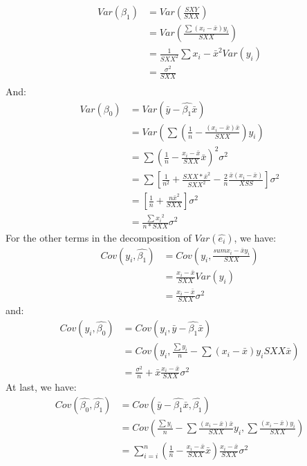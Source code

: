 \documentclass[12pt]{article}
\begin{document}
{\begin{align*}
 Var(\beta_1)&=Var(\frac{SXY}{SXX})\\
             &=Var(\frac{\sum{(x_i-\bar{x})}y_i}{SXX})\\
             &=\frac{1}{SXX^2}\sum{x_i-\bar{x}}^2Var(y_i)\\
             &=\frac{\sigma^2}{SXX}\\
\end{align*}
And:\\
\begin{align*}
 Var(\beta_0)&=Var(\bar{y}-\hat{\beta_1}\bar{x})\\
             &=Var(\sum{(\frac{1}{n}-\frac{(x_i-\bar{x})\bar{x}}{SXX})y_i})\\
             &=\sum{(\frac{1}{n}-\frac{x_i-\bar{x}}{SXX}\bar{x})^2}\sigma^2\\
             &=\sum{[\frac{1}{n^2}+\frac{SXX*\bar{x}^2}{SXX^2}-\frac{2}{n}\frac{\bar{x}(x_i-\bar{x})}{XSS}]}\sigma^2\\
             &=[\frac{1}{n}+\frac{n\bar{x}^2}{SXX}]\sigma^2\\
             &=\frac{\sum{x_i}^2}{n*SXX}\sigma^2
\end{align*}
For the other terms in the decomposition of $Var(\hat{e_i})$, we
have:\\
\begin{align*}
 Cov(y_i,\hat{\beta_1})&=Cov(y_i,\frac{sum{x_i-\bar{x}}y_i}{SXX})\\
                       &=\frac{x_i-\bar{x}}{SXX}Var(y_i)\\
                       &=\frac{x_i-\bar{x}}{SXX}\sigma^2
\end{align*}
and:\\
\begin{align*}
 Cov(y_i,\hat{\beta_0})&=Cov(y_i,\bar{y}-\hat{\beta_1}\bar{x})\\
                       &=Cov(y_i,\frac{\sum{y_i}}{n}-\sum{(x_i-\bar{x})y_i}{SXX}\bar{x})\\
                       &=\frac{\sigma^2}{n}+\bar{x}\frac{x_i-\bar{x}}{SXX}\sigma^2
\end{align*}
At last, we have:\\
\begin{align*}
 Cov(\hat{\beta_0},\hat{\beta_1})&=Cov(\bar{y}-\hat{\beta_1}\bar{x},\hat{\beta_1})\\
                                 &=Cov(\frac{\sum{y_i}}{n}-\sum{\frac{(x_i-\bar{x})\bar{x}}{SXX}}y_i,\sum{\frac{(x_i-\bar{x})y_i}{SXX}})\\
                                 &=\displaystyle\sum_{i=i}^{n}(\frac{1}{n}-\frac{x_i-\bar{x}}{SXX}\bar{x})\frac{x_i-\bar{x}}{SXX}\sigma^2\\

\end{align*}}
\end{document}
